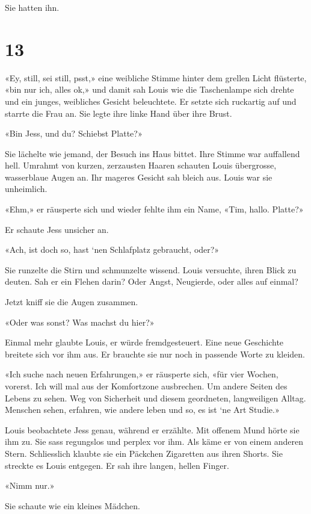 Sie hatten ihn.

\chapter{13}\label{section-12}

«Ey, still, sei still, psst,» eine weibliche Stimme hinter dem grellen
Licht flüsterte, «bin nur ich, alles ok,» und damit sah Louis wie die
Taschenlampe sich drehte und ein junges, weibliches Gesicht beleuchtete.
Er setzte sich ruckartig auf und starrte die Frau an. Sie legte ihre
linke Hand über ihre Brust.

«Bin Jess, und du? Schiebst Platte?»

Sie lächelte wie jemand, der Besuch ins Haus bittet. Ihre Stimme war
auffallend hell. Umrahmt von kurzen, zerzausten Haaren schauten Louis
übergrosse, wasserblaue Augen an. Ihr mageres Gesicht sah bleich aus.
Louis war sie unheimlich.

«Ehm,» er räusperte sich und wieder fehlte ihm ein Name, «Tim, hallo.
Platte?»

Er schaute Jess unsicher an.

«Ach, ist doch so, hast `nen Schlafplatz gebraucht, oder?»

Sie runzelte die Stirn und schmunzelte wissend. Louis versuchte, ihren
Blick zu deuten. Sah er ein Flehen darin? Oder Angst, Neugierde, oder
alles auf einmal?

Jetzt kniff sie die Augen zusammen.

«Oder was sonst? Was machst du hier?»

Einmal mehr glaubte Louis, er würde fremdgesteuert. Eine neue Geschichte
breitete sich vor ihm aus. Er brauchte sie nur noch in passende Worte zu
kleiden.

«Ich suche nach neuen Erfahrungen,» er räusperte sich, «für vier Wochen,
vorerst. Ich will mal aus der Komfortzone ausbrechen. Um andere Seiten
des Lebens zu sehen. Weg von Sicherheit und diesem geordneten,
langweiligen Alltag. Menschen sehen, erfahren, wie andere leben und so,
es ist `ne Art Studie.»

Louis beobachtete Jess genau, während er erzählte. Mit offenem Mund
hörte sie ihm zu. Sie sass regungslos und perplex vor ihm. Als käme er
von einem anderen Stern. Schliesslich klaubte sie ein Päckchen
Zigaretten aus ihren Shorts. Sie streckte es Louis entgegen. Er sah ihre
langen, hellen Finger.

«Nimm nur.»

Sie schaute wie ein kleines Mädchen.

